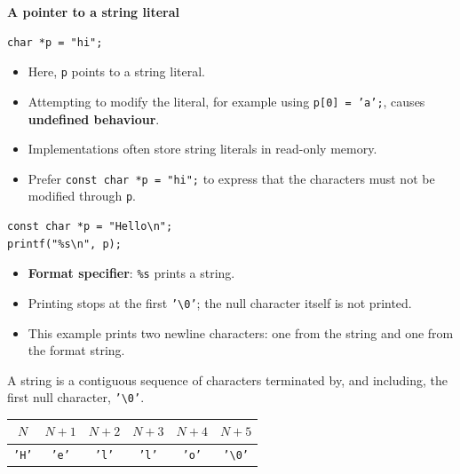 \documentclass[11pt,a4paper]{article}
\begin{document}
\textbf{A pointer to a string literal}

\begin{lstlisting}[style=cscode]
char *p = "hi";
\end{lstlisting}

\begin{itemize}
    \item Here, \texttt{p} points to a string literal.
    \item Attempting to modify the literal, for example using
          \texttt{p[0] = 'a';}, causes
          \textbf{undefined behaviour}.
    \item Implementations often store string literals in read-only
          memory.
    \item Prefer \texttt{const char *p = "hi";} to express that the
          characters must not be modified through \texttt{p}.
\end{itemize}


\begin{lstlisting}[style=cscode]
const char *p = "Hello\n";
printf("%s\n", p);
\end{lstlisting}

\begin{itemize}
    \item \textbf{Format specifier}: \texttt{\%s} prints a string.
    \item Printing stops at the first
          \texttt{'\textbackslash0'}; the null character itself
          is not printed.
    \item This example prints two newline characters: one from the
          string and one from the format string.
\end{itemize}





A string is a contiguous sequence of characters terminated by,
and including, the first null character,
\texttt{'\textbackslash0'}.

\begin{center}
\begin{tabular}{@{}*{6}{c}@{}}
\toprule
\(N\) & \(N+1\) & \(N+2\) & \(N+3\) & \(N+4\) & \(N+5\) \\
\midrule
\texttt{'H'} &
\texttt{'e'} &
\texttt{'l'} &
\texttt{'l'} &
\texttt{'o'} &
\texttt{'\textbackslash0'} \\
\bottomrule
\end{tabular}
\end{center}
\end{document}
